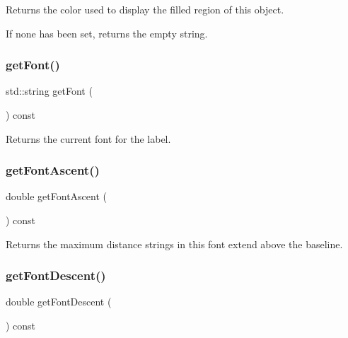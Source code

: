 Returns the color used to display the filled region of this object. 

If none has been set, returns the empty string. \mbox{\label{classGText_a894a5502900794eeb27d084c21f1d77d}} 
\subsubsection{\texorpdfstring{get\+Font()}{getFont()}}
{\footnotesize\ttfamily std\+::string get\+Font (\begin{DoxyParamCaption}{ }\end{DoxyParamCaption}) const\hspace{0.3cm}{\ttfamily [virtual]}}



Returns the current font for the label. 

\mbox{\label{classGText_ab7583914978530e097034293e9d316ad}} 
\subsubsection{\texorpdfstring{get\+Font\+Ascent()}{getFontAscent()}}
{\footnotesize\ttfamily double get\+Font\+Ascent (\begin{DoxyParamCaption}{ }\end{DoxyParamCaption}) const\hspace{0.3cm}{\ttfamily [virtual]}}



Returns the maximum distance strings in this font extend above the baseline. 

\mbox{\label{classGText_a2908216e19046c9747c0fc3b0d088621}} 
\subsubsection{\texorpdfstring{get\+Font\+Descent()}{getFontDescent()}}
{\footnotesize\ttfamily double get\+Font\+Descent (\begin{DoxyParamCaption}{ }\end{DoxyParamCaption}) const\hspace{0.3cm}{\ttfamily [virtual]}}



